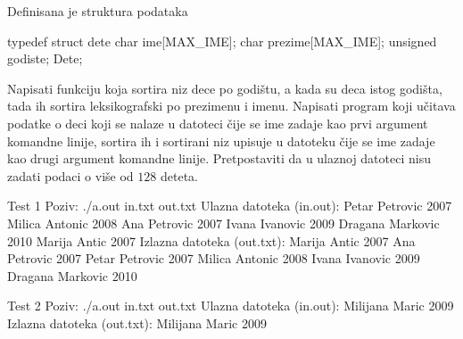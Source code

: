 \begin{Answer}[ref=509]
\end{Answer}
\begin{Exercise}[label=510]
  Definisana je struktura podataka
\begin{ckod}
typedef struct dete
{
      char ime[MAX_IME];
      char prezime[MAX_IME];
      unsigned godiste;
} Dete;
\end{ckod}
Napisati funkciju koja sortira niz dece po godištu, a kada su deca
istog godišta, tada ih sortira leksikografski po prezimenu i
imenu. Napisati program koji učitava podatke o deci koji se nalaze u
datoteci čije se ime zadaje kao prvi argument komandne linije,
sortira ih i sortirani niz upisuje u datoteku čije se ime zadaje kao
drugi argument komandne linije. Pretpostaviti da u ulaznoj datoteci
nisu zadati podaci o više od $128$ deteta.
  
\begin{miditest}
\begin{test}{Test 1}
Poziv: ./a.out in.txt out.txt
Ulazna datoteka (in.out):
  Petar Petrovic 2007
  Milica Antonic 2008
  Ana Petrovic 2007
  Ivana Ivanovic 2009
  Dragana Markovic 2010
  Marija Antic 2007
Izlazna datoteka (out.txt):
  Marija Antic 2007
  Ana Petrovic 2007
  Petar Petrovic 2007
  Milica Antonic 2008
  Ivana Ivanovic 2009
  Dragana Markovic 2010
\end{test}
\end{miditest}
\begin{miditest}
\begin{test}{Test 2}
Poziv: ./a.out in.txt out.txt
Ulazna datoteka (in.out):
  Milijana Maric 2009
Izlazna datoteka (out.txt):
  Milijana Maric 2009
\end{test}
\end{miditest}
  
\end{Exercise}

